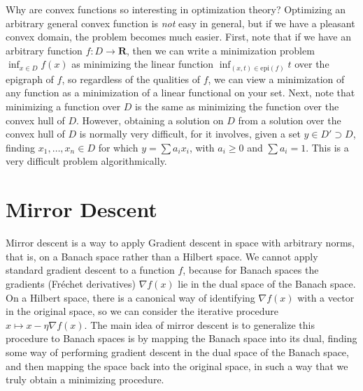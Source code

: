 Why are convex functions so interesting in optimization theory? Optimizing an arbitrary general convex function is {\it not} easy in general, but if we have a pleasant convex domain, the problem becomes much easier. First, note that if we have an arbitrary function $f: D \to \mathbf{R}$, then we can write a minimization problem $\inf_{x \in D} f(x)$ as minimizing the linear function $\inf_{(x,t) \in \text{epi}(f)} t$ over the epigraph of $f$, so regardless of the qualities of $f$, we can view a minimization of any function as a minimization of a linear functional on your set. Next, note that minimizing a function over $D$ is the same as minimizing the function over the convex hull of $D$. However, obtaining a solution on $D$ from a solution over the convex hull of $D$ is normally very difficult, for it involves, given a set $y \in D' \supset D$, finding $x_1, \dots, x_n \in D$ for which $y = \sum a_i x_i$, with $a_i \geq 0$ and $\sum a_i = 1$. This is a very difficult problem algorithmically.

\chapter{Mirror Descent}

Mirror descent is a way to apply Gradient descent in space with arbitrary norms, that is, on a Banach space rather than a Hilbert space. We cannot apply standard gradient descent to a function $f$, because for Banach spaces the gradients (Fr\'{e}chet derivatives) $\nabla f(x)$ lie in the dual space of the Banach space. On a Hilbert space, there is a canonical way of identifying $\nabla f(x)$ with a vector in the original space, so we can consider the iterative procedure $x \mapsto x - \eta \nabla f(x)$. The main idea of mirror descent is to generalize this procedure to Banach spaces is by mapping the Banach space into its dual, finding some way of performing gradient descent in the dual space of the Banach space, and then mapping the space back into the original space, in such a way that we truly obtain a minimizing procedure.

